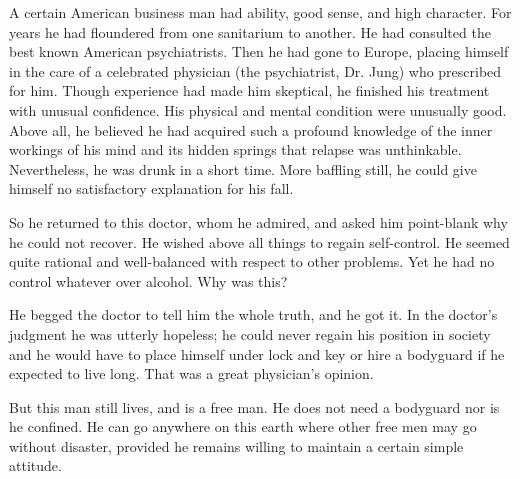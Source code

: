\begin{biblechapter}

A certain American business man had ability, good sense, and high character. 
For years he had floundered from one sanitarium to another. 
He had consulted the best known American psychiatrists. 
Then he had gone to Europe, placing himself in the care of a celebrated physician (the psychiatrist, Dr. Jung) who prescribed for him. 
Though experience had made him skeptical, he finished his treatment with unusual confidence. 
His physical and mental condition were unusually good. 
Above all, he believed he had acquired such a profound knowledge of the inner workings of his mind and its hidden springs that relapse was unthinkable. 
Nevertheless, he was drunk in a short time. 
More baffling still, he could give himself no satisfactory explanation for his fall.

So he returned to this doctor, whom he admired, 
and asked him point-blank why he could not recover. 
He wished above all things to regain self-control. 
He seemed quite rational and well-balanced with respect to other problems. 
Yet he had no control whatever over alcohol. 
Why was this?

He begged the doctor to tell him the whole truth, and he got it. 
In the doctor's judgment he was utterly hopeless; 
he could never regain his position in society 
and he would have to place himself under lock and key or hire a bodyguard if he expected to live long. 
That was a great physician's opinion.

But this man still lives, and is a free man. 
He does not need a bodyguard nor is he confined. 
He can go anywhere on this earth where other free men may go without disaster, 
provided he remains willing to maintain a certain simple attitude.
\end{biblechapter}


